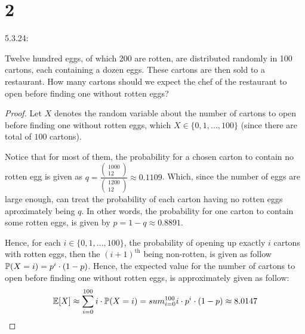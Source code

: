 \documentclass{article}
\begin{document}
\newpage
\section*{2}
\begin{ques}\label{q2}
    5.3.24:

    Twelve hundred eggs, of which 200 are rotten, are distributed randomly in 100 cartons, each containing a dozen eggs. These cartons are then sold to a restaurant. How many cartons should we expect the chef of the restaurant to open before finding one without rotten eggs?
\end{ques}

\begin{proof}

    Let $X$ denotes the random variable about the number of cartons to open before finding one without rotten eggs, which $X \in\{0,1,...,100\}$ (since there are total of $100$ cartons). 

    Notice that for most of them, the probability for a chosen carton to contain no rotten egg is given as $q=\frac{\begin{pmatrix}1000\\12\end{pmatrix}}{\begin{pmatrix}1200\\12\end{pmatrix}}\approx 0.1109$. Which, since the number of eggs are large enough, can treat the probability of each carton having no rotten eggs aproximately being $q$. In other words, the probability for one carton to contain some rotten eggs, is given by $p = 1-q \approx 0.8891$.

    Hence, for each $i\in\{0,1,...,100\}$, the probability of opening up exactly $i$ cartons with rotten eggs, then the $(i+1)^\text{th}$ being non-rotten, is given as follow $\mathbb{P}(X=i) = p^i \cdot (1-p)$. Hence, the expected value for the number of cartons to open before finding one without rotten eggs, is approximately given as follow:
    \begin{align}
        \mathbb{E}[X] \approx \sum_{i=0}^{100}i \cdot \mathbb{P}(X=i) = sum_{i=0}^{100}i\cdot p^i \cdot (1-p) \approx 8.0147
    \end{align}


\end{proof}
\end{document}

